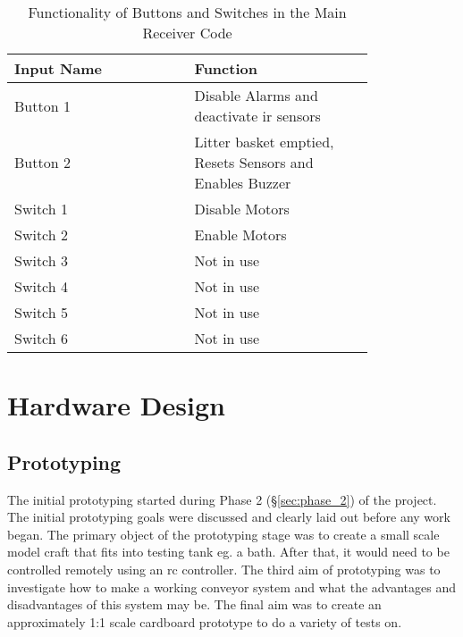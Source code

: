 \documentclass [12pt]{article}
\begin{document}
\begin{table}[H]
\centering
\setlength{\arrayrulewidth}{1.5pt}
\begin{tabular}{|p{0.4\linewidth}|p{0.4\linewidth}|}
\hline
\cellcolor{gray!40}Input Name & \cellcolor{gray!40}Function \\ 
\hline
\cellcolor{gray!20} Button 1 & \cellcolor{gray!20} Disable Alarms and deactivate \gls{ir} sensors\\
\hline
\cellcolor{gray!20} Button 2 & \cellcolor{gray!20} Litter basket emptied, Resets Sensors and Enables Buzzer\\
\hline
\cellcolor{gray!20} Switch 1 & \cellcolor{gray!20} Disable Motors\\
\hline
\cellcolor{gray!20} Switch 2& \cellcolor{gray!20} Enable Motors\\
\hline
\cellcolor{gray!20} Switch 3 & \cellcolor{gray!20} Not in use\\
\hline
\cellcolor{gray!20} Switch 4 & \cellcolor{gray!20} Not in use\\
\hline
\cellcolor{gray!20} Switch 5 & \cellcolor{gray!20} Not in use\\
\hline
\cellcolor{gray!20} Switch 6 & \cellcolor{gray!20} Not in use\\
\hline
\end{tabular}
\caption{Functionality of Buttons and Switches in the Main Receiver Code }
\label{table:inputs_main_code}
\end{table}


\section{Hardware Design}
\subsection{Prototyping}

The initial prototyping started during Phase 2 (§\ref{sec:phase_2}) of the project. The initial prototyping goals were discussed and clearly laid out before any work began. The primary object of the prototyping stage was to create a small scale model craft that fits into testing tank eg. a bath. After that, it would need to be controlled remotely using an \gls{rc} controller. The third aim of prototyping was to investigate how to make a working conveyor system and what the advantages and disadvantages of this system may be. The final aim was to create an approximately 1:1 scale cardboard prototype to do a variety of tests on. 
\end{document}
